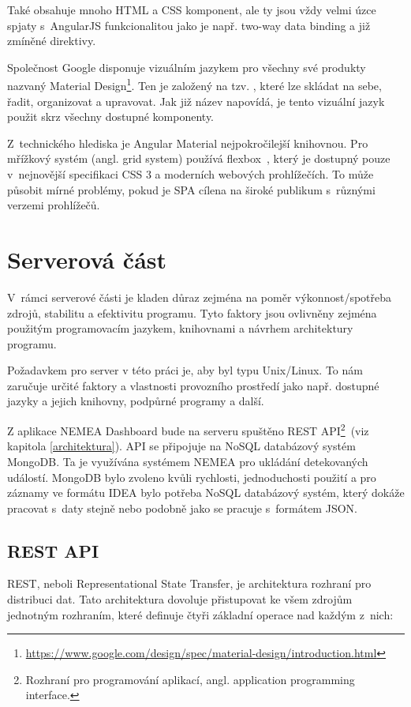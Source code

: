 Také obsahuje mnoho HTML a CSS komponent, ale ty jsou vždy velmi úzce spjaty s~AngularJS funkcionalitou jako je např. two-way data binding a již zmíněné direktivy. 

Společnost Google disponuje vizuálním jazykem pro všechny své produkty nazvaný Material Design\footnote{\url{https://www.google.com/design/spec/material-design/introduction.html}}. Ten je založený na tzv. , které lze skládat na sebe, řadit, organizovat a upravovat. Jak již název napovídá, je tento vizuální jazyk použit skrz všechny dostupné komponenty.

Z~technického hlediska je Angular Material nejpokročilejší knihovnou. Pro mřížkový systém (angl. grid system) používá flexbox~\cite{flexbox}, který je dostupný pouze v~nejnovější specifikaci CSS 3 a moderních webových prohlížečích. To může působit mírné problémy, pokud je SPA cílena na široké publikum s~různými verzemi prohlížečů.


\section{Serverová část}

V~rámci serverové části je kladen důraz zejména na poměr výkonnost/spotřeba zdrojů, stabilitu a efektivitu programu. Tyto faktory jsou ovlivněny zejména použitým programovacím jazykem, knihovnami a návrhem architektury programu.

Požadavkem pro server v této práci je, aby byl typu Unix/Linux. To nám zaručuje určité faktory a vlastnosti provozního prostředí jako např. dostupné jazyky a jejich knihovny, podpůrné programy a další.

Z aplikace NEMEA Dashboard bude na serveru spuštěno REST API\footnote{Rozhraní pro programování aplikací, angl. application programming interface.}~\cite{rest}(viz kapitola \ref{architektura}). API se připojuje na NoSQL databázový systém MongoDB. Ta je využívána systémem NEMEA pro ukládání detekovaných událostí. MongoDB bylo zvoleno kvůli rychlosti, jednoduchosti použití a pro záznamy ve formátu IDEA bylo potřeba NoSQL databázový systém, který dokáže pracovat s~daty stejně nebo podobně jako se pracuje s~formátem JSON.

\subsection{REST API}
\label{crud}

REST, neboli Representational State Transfer, je architektura rozhraní pro distribuci dat. Tato architektura dovoluje přistupovat ke všem zdrojům jednotným rozhraním, které definuje čtyři základní operace nad každým z~nich:

